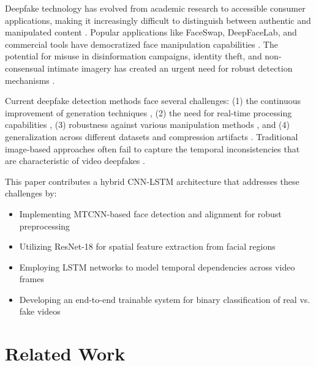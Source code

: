 \documentclass[conference]{IEEEtran}
\begin{document}
Deepfake technology has evolved from academic research to accessible consumer applications, making it increasingly difficult to distinguish between authentic and manipulated content \cite{kietzmann2020deepfakes}. Popular applications like FaceSwap, DeepFaceLab, and commercial tools have democratized face manipulation capabilities \cite{mirsky2021creation}. The potential for misuse in disinformation campaigns, identity theft, and non-consensual intimate imagery has created an urgent need for robust detection mechanisms \cite{dolhansky2020deepfake, vaccari2020deepfakes}.

Current deepfake detection methods face several challenges: (1) the continuous improvement of generation techniques \cite{karras2019style}, (2) the need for real-time processing capabilities \cite{hasan2021combating}, (3) robustness against various manipulation methods \cite{li2020celeb}, and (4) generalization across different datasets and compression artifacts \cite{carlini2020evading}. Traditional image-based approaches often fail to capture the temporal inconsistencies that are characteristic of video deepfakes \cite{choi2020temporal}.

This paper contributes a hybrid CNN-LSTM architecture that addresses these challenges by:
\begin{itemize}
\item Implementing MTCNN-based face detection and alignment for robust preprocessing \cite{zhang2016joint}
\item Utilizing ResNet-18 for spatial feature extraction from facial regions \cite{he2016deep}
\item Employing LSTM networks to model temporal dependencies across video frames \cite{hochreiter1997long}
\item Developing an end-to-end trainable system for binary classification of real vs. fake videos
\end{itemize}

\section{Related Work}

\end{document}
